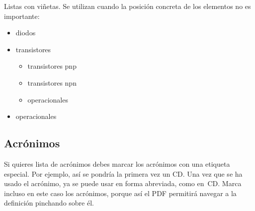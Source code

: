 Listas con viñetas. Se utilizan cuando la posición concreta de los elementos no es importante:

\begin{itemize}
\item diodos
\item transistores
    \begin{itemize}
    \item transistores pnp
    \item transistores npn
    \item operacionales
    \end{itemize}
\item operacionales
\end{itemize}

\subsection{Acrónimos}

Si quieres lista de acrónimos debes marcar los acrónimos con una etiqueta especial.  Por ejemplo, así se pondría la primera vez un \acrfull{CD}.  Una vez que se ha usado el acrónimo, ya se puede usar en forma abreviada, como en~\acrshort{CD}.  Marca incluso en este caso los acrónimos, porque así el PDF permitirá navegar a la definición pinchando sobre él.
